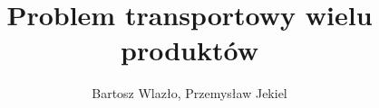 \documentclass{article}
\begin{document}
\title{Problem transportowy wielu produktów}
\author{Bartosz Wlazło, Przemysław Jekiel}
\maketitle
\end{document}
